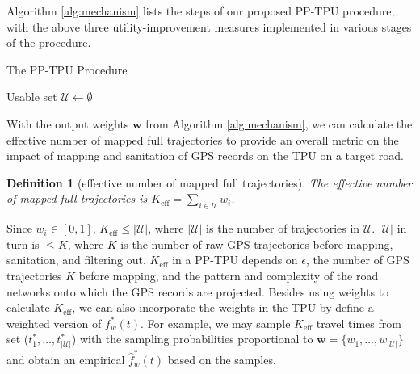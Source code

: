 \documentclass[10pt,journal,compsoc]{IEEEtran}
\newtheorem{defn}{Definition}
\begin{document}
Algorithm \ref{alg:mechanism} lists the steps of our proposed PP-TPU procedure, with the above three utility-improvement measures implemented in various stages of the procedure.  \vspace{-6pt}
\begin{algorithm}
\caption{The PP-TPU Procedure}\label{alg:mechanism}
\SetAlgoLined
{}
Usable set $\mathcal{U}\leftarrow\emptyset$\; 
\end{algorithm} 
\vspace{-3pt}
With the output weights $\mathbf{w}$ from Algorithm \ref{alg:mechanism}, we can calculate the effective number of mapped full trajectories to provide an overall metric on the impact of mapping  and sanitation of GPS records on the TPU on a target road.
\begin{defn}[effective number of mapped full trajectories]\label{def:eff} The effective  number of mapped  full trajectories is $K_{\text{eff}}=\sum_{i\in\mathcal{U}}w_i$.
\end{defn}
Since $w_i\in[0,1]$, $K_{\text{eff}}\le|\mathcal{U}|$, where $|\mathcal{U}|$ is the number of trajectories in  $\mathcal{U}$. $|\mathcal{U}|$ in turn is $\le K$, where $K$ is the number of raw GPS trajectories before mapping, sanitation, and filtering out. $K_{\text{eff}}$ in a PP-TPU depends on $\epsilon$, the number of  GPS trajectories $K$ before mapping, and the pattern and complexity of the road networks onto which the GPS records are projected.   Besides using weights to calculate $K_{\text{eff}}$, we can also incorporate the weights in the TPU by define a weighted version of $f^*_w(t)$. For example, we may sample $K_{\text{eff}}$ travel times from set ($t^*_1,\ldots,t^*_{|\mathcal{U}|}$) with the sampling probabilities proportional to $\mathbf{w}=\{w_1,\ldots,w_{|\mathcal{U}|}\}$ and obtain an empirical $\hat{f}^*_w(t)$ based on the samples.
\end{document}
